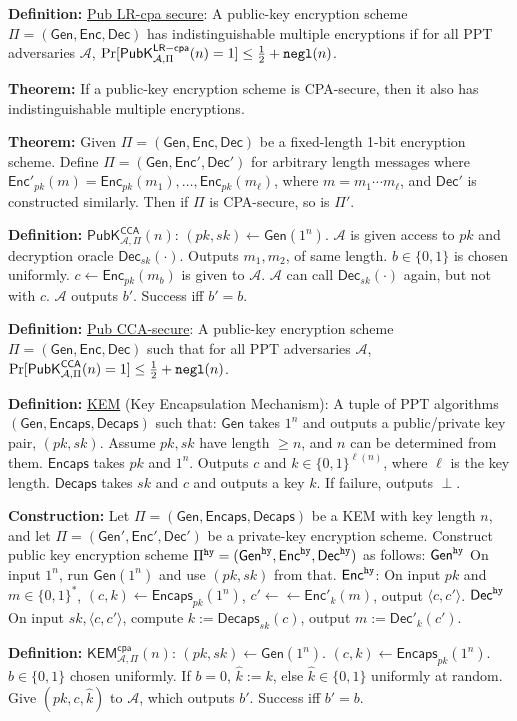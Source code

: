 \documentclass[10pt]{article}
\newcommand{\AAA}{\mathcal{A}}
\newcommand{\defn}[1]{{\bf Definition:} \underline{#1}}
\newcommand{\thm}[1]{{\bf Theorem:} \underline{#1}}
\newcommand{\con}[1]{{\bf Construction:} \underline{#1}}
\newcommand{\Enc}{\mathsf{Enc}}
\newcommand{\Dec}{\mathsf{Dec}}
\newcommand{\Encaps}{\mathsf{Encaps}}
\newcommand{\Decaps}{\mathsf{Decaps}}
\newcommand{\Gen}{\mathsf{Gen}}
\newcommand{\ang}[1]{\langle#1\rangle}
\newcommand{\GenEncDec}{(\Gen,\Enc,\Dec)}
\newcommand{\GenEncapsDecaps}{(\Gen,\Encaps,\Decaps)}
\newcommand{\ExptPubCcaArgs}[2]{\mathsf{PubK}^{\mathsf{CCA}}_{#1,#2}}
\newcommand{\ExptPubCpaArgs}[2]{\mathsf{PubK}^{\mathsf{LR-cpa}}_{#1,#2}}
\newcommand{\ExptKemCpa}{\mathsf{KEM}^{\mathsf{cpa}}_{\AAA,\Pi}}
\newcommand{\ExptPubCca}{\ExptPubCcaArgs{\AAA}{\Pi}}
\newcommand{\ExptPubCpa}{\ExptPubCpaArgs{\AAA}{\Pi}}
\newcommand{\negl}{{\tt negl}}
\newcommand{\hy}{{\tt hy}}
\newcommand{\from}{\leftarrow}
\begin{document}
\begin{multicols}{3}
\defn{Pub LR-cpa secure}: A public-key encryption scheme $\Pi=\GenEncDec$ has indistinguishable multiple encryptions if for all PPT adversaries $\AAA$, $\Pr[\ExptPubCpa(n)=1]\leq\frac{1}{2}+\negl(n)$.

\thm{}If a public-key encryption scheme is CPA-secure, then it also has indistinguishable multiple encryptions.

\thm{}Given $\Pi=\GenEncDec$ be a fixed-length 1-bit encryption scheme. Define $\Pi=(\Gen,\Enc',\Dec')$ for arbitrary length messages where $\Enc'_{pk}(m)=\Enc_{pk}(m_1),\dots,\Enc_{pk}(m_\ell)$, where $m=m_1\cdots m_\ell$, and $\Dec'$ is constructed similarly. Then if $\Pi$ is CPA-secure, so is $\Pi'$.

\defn{$\ExptPubCca(n)$}: $(pk,sk)\from\Gen(1^n)$. $\AAA$ is given access to $pk$ and decryption oracle $\Dec_{sk}(\cdot)$. Outputs $m_1,m_2$, of same length. $b\in\{0,1\}$ is chosen uniformly. $c\from\Enc_{pk}(m_b)$ is given to $\AAA$. $\AAA$ can call $\Dec_{sk}(\cdot)$ again, but not with $c$. $\AAA$ outputs $b'$. Success iff $b'=b$.

\defn{Pub CCA-secure}: A public-key encryption scheme $\Pi=\GenEncDec$ such that for all PPT adversaries $\AAA$, $\Pr[\ExptPubCca(n)=1]\leq\frac{1}{2}+\negl(n)$.

\defn{KEM} (Key Encapsulation Mechanism): A tuple of PPT algorithms $\GenEncapsDecaps$ such that: $\Gen$ takes $1^n$ and outputs a public/private key pair, $(pk,sk)$. Assume $pk,sk$ have length $\geq n$, and $n$ can be determined from them. $\Encaps$ takes $pk$ and $1^n$. Outputs $c$ and $k\in\{0,1\}^{\ell(n)}$, where $\ell$ is the key length. $\Decaps$ takes $sk$ and $c$ and outputs a key $k$. If failure, outputs $\perp$.

\con{}Let $\Pi=\GenEncapsDecaps$ be a KEM with key length $n$, and let $\Pi=(\Gen',\Enc',\Dec')$ be a private-key encryption scheme. Construct public key encryption scheme $\Pi^{\hy}=(\Gen^\hy,\Enc^\hy,\Dec^\hy)$ as follows: $\Gen^\hy$ On input $1^n$, run $\Gen(1^n)$ and use $(pk,sk)$ from that. $\Enc^\hy$: On input $pk$ and $m\in\{0,1\}^*$, $(c,k)\from\Encaps_{pk}(1^n)$, $c'\from\from\Enc'_k(m)$, output $\ang{c,c'}$. $\Dec^\hy$ On input $sk,\ang{c,c'}$, compute $k:=\Decaps_{sk}(c)$, output $m:=\Dec'_k(c')$.

\defn{$\ExptKemCpa(n)$}: $(pk,sk)\from\Gen(1^n)$. $(c,k)\from\Encaps_{pk}(1^n)$. $b\in\{0,1\}$ chosen uniformly. If $b=0$, $\hat{k}:=k$, else $\hat{k}\in\{0,1\}$ uniformly at random. Give $(pk,c,\hat{k})$ to $\AAA$, which outputs $b'$. Success iff $b'=b$.


\end{multicols}
\end{document}

